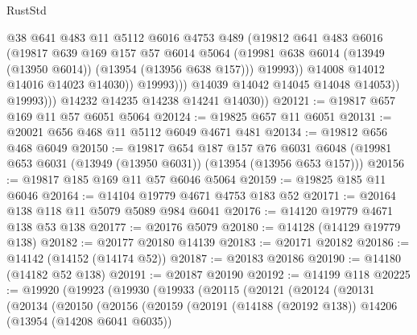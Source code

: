 \begin{lexlean}{RustStd}
\begin{coremodule}
                            @38
                            @641
                            @483
                            @11
                            @5112
                            @6016
                            @4753
                            @489
                            (@19812
                              @641
                              @483
                              @6016
                              (@19817
                                @639
                                @169
                                @157
                                @57
                                @6014
                                @5064
                                (@19981
                                  @638
                                  @6014
                                  (@13949 (@13950 @6014))
                                  (@13954 (@13956 @638 @157)))
                                @19993))
                            @14008
                            @14012
                            @14016
                            @14023
                            @14030))
                        @19993)))
                  @14039
                  @14042
                  @14045
                  @14048
                  @14053))
              @19993)))
        @14232
        @14235
        @14238
        @14241
        @14030))
@20121 := @19817 @657 @169 @11 @57 @6051 @5064
@20124 := @19825 @657 @11 @6051
@20131 := @20021 @656 @468 @11 @5112 @6049 @4671 @481
@20134 := @19812 @656 @468 @6049
@20150 := @19817
    @654
    @187
    @157
    @76
    @6031
    @6048
    (@19981 @653 @6031 (@13949 (@13950 @6031)) (@13954 (@13956 @653 @157)))
@20156 := @19817 @185 @169 @11 @57 @6046 @5064
@20159 := @19825 @185 @11 @6046
@20164 := @14104 @19779 @4671 @4753 @183 @52
@20171 := @20164 @138 @118 @11 @5079 @5089 @984 @6041
@20176 := @14120 @19779 @4671 @138 @53 @138
@20177 := @20176 @5079
@20180 := @14128 (@14129 @19779 @138)
@20182 := @20177 @20180 @14139
@20183 := @20171 @20182
@20186 := @14142 (@14152 (@14174 @52))
@20187 := @20183 @20186
@20190 := @14180 (@14182 @52 @138)
@20191 := @20187 @20190
@20192 := @14199 @118
@20225 := @19920
    (@19923
      (@19930
        (@19933
          (@20115
            (@20121
              (@20124
                (@20131
                  (@20134
                    (@20150
                      (@20156
                        (@20159
                          (@20191
                            (@14188 (@20192 @138))
                            @14206
                            (@13954 (@14208 @6041 @6035))

\end{coremodule}
\end{lexlean}
